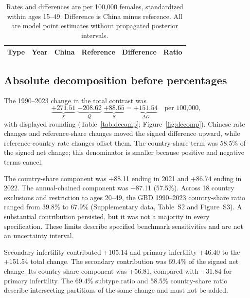 \documentclass[11pt,a4paper]{article}
\begin{document}
\begin{table}[htbp]\centering\small{}
\caption{PCOS-attributed infertility rates and contrasts under contemporary GBD population shares.}\label{tab:pcos}
\begin{tabular}{llrrrr}\toprule
Type & Year & China & Reference & Difference & Ratio\\\midrule
\end{tabular}
\caption*{Rates and differences are per 100,000 females, standardized within ages 15--49. Difference is China minus reference. All are model point estimates without propagated posterior intervals.}
\end{table}

\subsection{Absolute decomposition before percentages}
The 1990--2023 change in the total contrast was
\begin{equation}
 \underbrace{+271.51}_{X}\;\underbrace{-208.62}_{Q}\;\underbrace{+88.65}_{S}
 =\underbrace{+151.54}_{\Delta D}\quad\text{per 100,000},
\end{equation}
with displayed rounding (Table~\ref{tab:decomp}; Figure~\ref{fig:decomp}). Chinese rate changes and reference-share changes moved the signed difference upward, while reference-country rate changes offset them. The country-share term was 58.5\% of the signed net change; this denominator is smaller because positive and negative terms cancel.

The country-share component was +88.11 ending in 2021 and +86.74 ending in 2022. The annual-chained component was +87.11 (57.5\%). Across 18 country exclusions and restriction to ages 20--49, the GBD 1990--2023 country-share ratio ranged from 39.8\% to 67.9\% (Supplementary data, Table~S2 and Figure~S3). A substantial contribution persisted, but it was not a majority in every specification. These limits describe specified benchmark sensitivities and are not an uncertainty interval.

Secondary infertility contributed +105.14 and primary infertility +46.40 to the +151.54 total change. The secondary contribution was 69.4\% of the signed net change. Its country-share component was +56.81, compared with +31.84 for primary infertility. The 69.4\% subtype ratio and 58.5\% country-share ratio describe intersecting partitions of the same change and must not be added.
\end{document}
